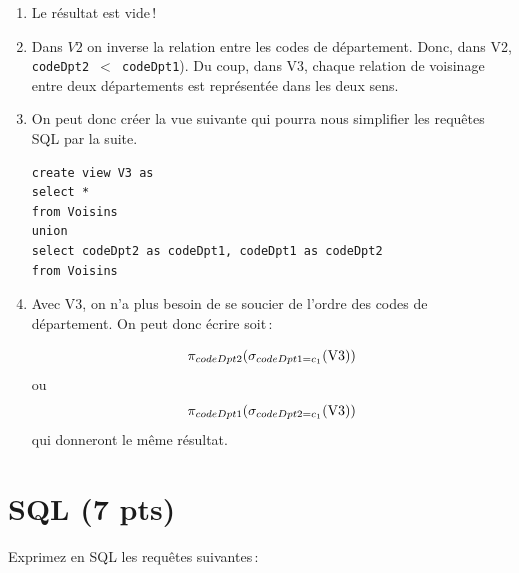 \begin{solution}

\begin{enumerate} 
  \item Le résultat est vide\,!

  \item Dans $V2$ on inverse la relation entre les codes de département. Donc, dans V2,
     \texttt{codeDpt2  $<$ codeDpt1}). Du coup, dans V3, chaque relation de voisinage
     entre deux départements est représentée dans les deux sens.
  
  \item On peut donc créer la vue suivante qui pourra nous simplifier les requêtes SQL
     par la suite.
     
\begin{verbatim}
create view V3 as
select *
from Voisins 
union
select codeDpt2 as codeDpt1, codeDpt1 as codeDpt2
from Voisins
\end{verbatim}

   \item Avec V3, on n'a plus besoin de se soucier de l'ordre des codes de département.
     On peut donc écrire soit\,:
   
   $$\pi_{codeDpt2} (\sigma_{codeDpt1=c_1} (\rm{V3}))$$   
   ou
   $$\pi_{codeDpt1} (\sigma_{codeDpt2=c_1} (\rm{V3}))$$
   qui donneront le même résultat.

\end{enumerate}

\end{solution}


\section{SQL (7 pts)}

Exprimez en SQL les requêtes suivantes\,:

